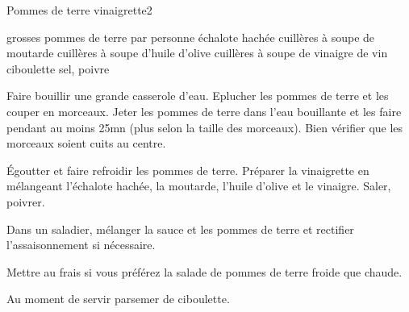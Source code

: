 \begin{recette}{Pommes de terre vinaigrette}{2}{}{}
\begin{ingredients}
 grosses pommes de terre par personne
 échalote hachée
 cuillères à soupe de moutarde
 cuillères à soupe d'huile d'olive
 cuillères à soupe de vinaigre de vin
\ingredient ciboulette
\ingredient sel, poivre
\end{ingredients}

\begin{preparation}
\etape Faire bouillir une grande casserole d'eau. Eplucher les pommes de terre et les couper en morceaux. Jeter les pommes de terre dans l'eau bouillante et les faire pendant au moins 25mn (plus selon la taille des morceaux). Bien vérifier que les morceaux soient cuits au centre.

\etape Égoutter et faire refroidir les pommes de terre. Préparer la vinaigrette en mélangeant l'échalote hachée, la moutarde, l'huile d'olive et le vinaigre. Saler, poivrer.

\etape Dans un saladier, mélanger la sauce et les pommes de terre et rectifier l'assaisonnement si nécessaire.

\begin{remarque}
Mettre au frais si vous préférez la salade de pommes de terre froide que chaude.
\end{remarque}

\etape Au moment de servir parsemer de ciboulette.
\end{preparation}
\end{recette}
